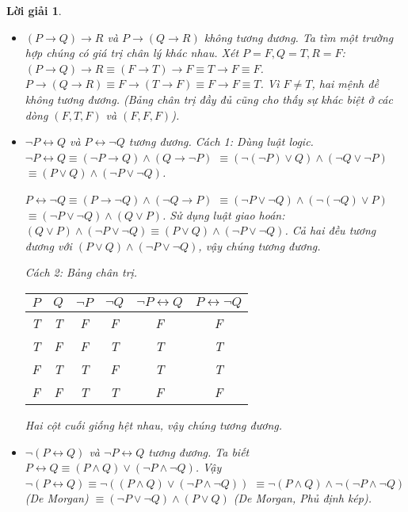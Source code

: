 \documentclass[11pt, oneside, a4paper]{article}
\newtheorem{loigiai}{Lời giải}[bt]
\begin{document}
    \begin{loigiai}
    \begin{itemize}
        \item[a)] $(P \rightarrow Q) \rightarrow R$ và $P \rightarrow (Q \rightarrow R)$ không tương đương.
        Ta tìm một trường hợp chúng có giá trị chân lý khác nhau.
        Xét $P=F, Q=T, R=F$:
        $(P \rightarrow Q) \rightarrow R \equiv (F \rightarrow T) \rightarrow F \equiv T \rightarrow F \equiv F$.
        $P \rightarrow (Q \rightarrow R) \equiv F \rightarrow (T \rightarrow F) \equiv F \rightarrow F \equiv T$.
        Vì $F \neq T$, hai mệnh đề không tương đương.
        (Bảng chân trị đầy đủ cũng cho thấy sự khác biệt ở các dòng $(F,T,F)$ và $(F,F,F)$).
    
        \item[b)] $\lnot P \leftrightarrow Q$ và $ P \leftrightarrow \lnot Q$ tương đương.
        Cách 1: Dùng luật logic.
        $\lnot P \leftrightarrow Q \equiv (\lnot P \rightarrow Q) \land (Q \rightarrow \lnot P)$
        $\equiv (\lnot(\lnot P) \lor Q) \land (\lnot Q \lor \lnot P)$
        $\equiv (P \lor Q) \land (\lnot P \lor \lnot Q)$.
    
        $P \leftrightarrow \lnot Q \equiv (P \rightarrow \lnot Q) \land (\lnot Q \rightarrow P)$
        $\equiv (\lnot P \lor \lnot Q) \land (\lnot(\lnot Q) \lor P)$
        $\equiv (\lnot P \lor \lnot Q) \land (Q \lor P)$.
        Sử dụng luật giao hoán: $(Q \lor P) \land (\lnot P \lor \lnot Q) \equiv (P \lor Q) \land (\lnot P \lor \lnot Q)$.
        Cả hai đều tương đương với $(P \lor Q) \land (\lnot P \lor \lnot Q)$, vậy chúng tương đương.
    
        Cách 2: Bảng chân trị.
        \begin{center}
        \begin{tabular}{|c|c|c|c|c|c|}
        \hline
        $P$ & $Q$ & $\lnot P$ & $\lnot Q$ & $\lnot P \leftrightarrow Q$ & $P \leftrightarrow \lnot Q$ \\
        \hline
        T & T & F & F & F & F \\
        T & F & F & T & T & T \\
        F & T & T & F & T & T \\
        F & F & T & T & F & F \\
        \hline
        \end{tabular}
        \end{center}
        Hai cột cuối giống hệt nhau, vậy chúng tương đương.
    
        \item[c)] $\lnot (P \leftrightarrow Q)$ và $ \lnot P \leftrightarrow Q$ tương đương.
        Ta biết $P \leftrightarrow Q \equiv (P \land Q) \lor (\lnot P \land \lnot Q)$.
        Vậy $\lnot (P \leftrightarrow Q) \equiv \lnot((P \land Q) \lor (\lnot P \land \lnot Q))$
        $\equiv \lnot(P \land Q) \land \lnot(\lnot P \land \lnot Q)$ (De Morgan)
        $\equiv (\lnot P \lor \lnot Q) \land (P \lor Q)$ (De Morgan, Phủ định kép).
    

\end{itemize}
\end{loigiai}
\end{document}
